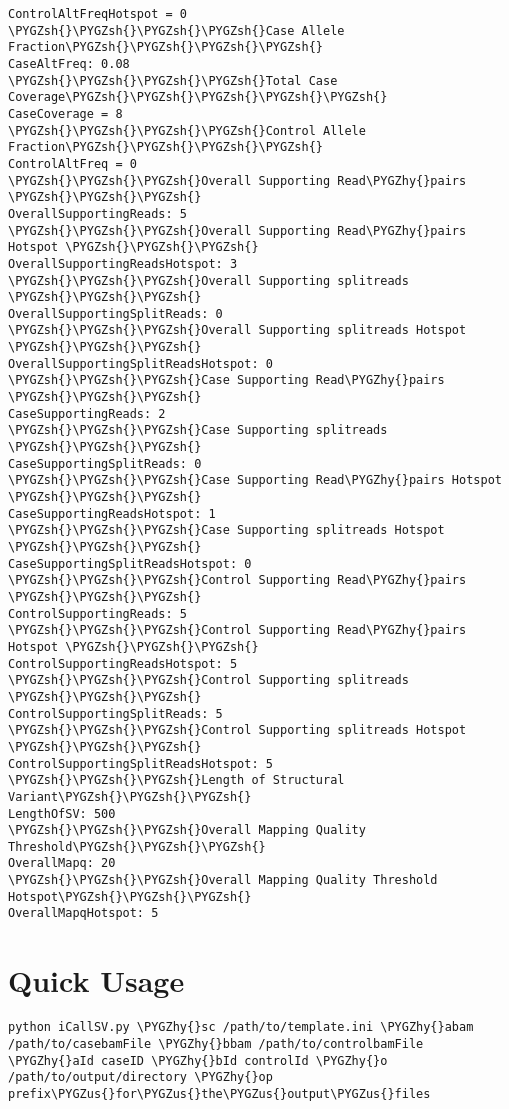 \documentclass[letterpaper,10pt,english]{sphinxmanual}
\def\PYGZus{\char`\_}
\def\PYGZsh{\char`\#}
\def\PYGZhy{\char`\-}
\begin{document}
\begin{Verbatim}[commandchars=\\\{\}]
ControlAltFreqHotspot = 0
\PYGZsh{}\PYGZsh{}\PYGZsh{}\PYGZsh{}Case Allele Fraction\PYGZsh{}\PYGZsh{}\PYGZsh{}\PYGZsh{}
CaseAltFreq: 0.08
\PYGZsh{}\PYGZsh{}\PYGZsh{}\PYGZsh{}Total Case Coverage\PYGZsh{}\PYGZsh{}\PYGZsh{}\PYGZsh{}\PYGZsh{}
CaseCoverage = 8
\PYGZsh{}\PYGZsh{}\PYGZsh{}\PYGZsh{}Control Allele Fraction\PYGZsh{}\PYGZsh{}\PYGZsh{}\PYGZsh{}
ControlAltFreq = 0
\PYGZsh{}\PYGZsh{}\PYGZsh{}Overall Supporting Read\PYGZhy{}pairs \PYGZsh{}\PYGZsh{}\PYGZsh{}
OverallSupportingReads: 5
\PYGZsh{}\PYGZsh{}\PYGZsh{}Overall Supporting Read\PYGZhy{}pairs Hotspot \PYGZsh{}\PYGZsh{}\PYGZsh{}
OverallSupportingReadsHotspot: 3
\PYGZsh{}\PYGZsh{}\PYGZsh{}Overall Supporting splitreads \PYGZsh{}\PYGZsh{}\PYGZsh{}
OverallSupportingSplitReads: 0
\PYGZsh{}\PYGZsh{}\PYGZsh{}Overall Supporting splitreads Hotspot \PYGZsh{}\PYGZsh{}\PYGZsh{}
OverallSupportingSplitReadsHotspot: 0
\PYGZsh{}\PYGZsh{}\PYGZsh{}Case Supporting Read\PYGZhy{}pairs \PYGZsh{}\PYGZsh{}\PYGZsh{}
CaseSupportingReads: 2
\PYGZsh{}\PYGZsh{}\PYGZsh{}Case Supporting splitreads \PYGZsh{}\PYGZsh{}\PYGZsh{}
CaseSupportingSplitReads: 0
\PYGZsh{}\PYGZsh{}\PYGZsh{}Case Supporting Read\PYGZhy{}pairs Hotspot \PYGZsh{}\PYGZsh{}\PYGZsh{}
CaseSupportingReadsHotspot: 1
\PYGZsh{}\PYGZsh{}\PYGZsh{}Case Supporting splitreads Hotspot \PYGZsh{}\PYGZsh{}\PYGZsh{}
CaseSupportingSplitReadsHotspot: 0
\PYGZsh{}\PYGZsh{}\PYGZsh{}Control Supporting Read\PYGZhy{}pairs \PYGZsh{}\PYGZsh{}\PYGZsh{}
ControlSupportingReads: 5
\PYGZsh{}\PYGZsh{}\PYGZsh{}Control Supporting Read\PYGZhy{}pairs Hotspot \PYGZsh{}\PYGZsh{}\PYGZsh{}
ControlSupportingReadsHotspot: 5
\PYGZsh{}\PYGZsh{}\PYGZsh{}Control Supporting splitreads \PYGZsh{}\PYGZsh{}\PYGZsh{}
ControlSupportingSplitReads: 5
\PYGZsh{}\PYGZsh{}\PYGZsh{}Control Supporting splitreads Hotspot \PYGZsh{}\PYGZsh{}\PYGZsh{}
ControlSupportingSplitReadsHotspot: 5
\PYGZsh{}\PYGZsh{}\PYGZsh{}Length of Structural Variant\PYGZsh{}\PYGZsh{}\PYGZsh{}
LengthOfSV: 500
\PYGZsh{}\PYGZsh{}\PYGZsh{}Overall Mapping Quality Threshold\PYGZsh{}\PYGZsh{}\PYGZsh{}
OverallMapq: 20
\PYGZsh{}\PYGZsh{}\PYGZsh{}Overall Mapping Quality Threshold Hotspot\PYGZsh{}\PYGZsh{}\PYGZsh{}
OverallMapqHotspot: 5
\end{Verbatim}


\section{Quick Usage}
\label{iCallSV:quick-usage}
\begin{Verbatim}[commandchars=\\\{\}]
python iCallSV.py \PYGZhy{}sc /path/to/template.ini \PYGZhy{}abam /path/to/casebamFile \PYGZhy{}bbam /path/to/controlbamFile \PYGZhy{}aId caseID \PYGZhy{}bId controlId \PYGZhy{}o /path/to/output/directory \PYGZhy{}op prefix\PYGZus{}for\PYGZus{}the\PYGZus{}output\PYGZus{}files
\end{Verbatim}
\end{document}
